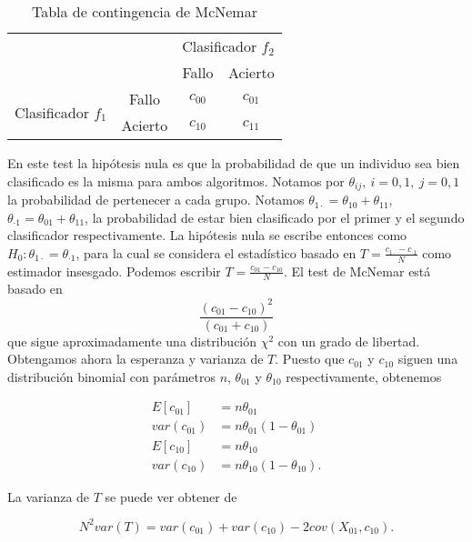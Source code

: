 \begin{table}[]
\centering
\caption{Tabla de contingencia de McNemar}
\label{Tb:McNemar}
\begin{tabular}{|lc|cc|}
\hline
                                                          &       & \multicolumn{2}{c|}{Clasificador $f_2$} \\ \cline{3-4} 
                                                          &         & Fallo              & Acierto            \\ \hline
\multicolumn{1}{|c|}{\multirow{2}{*}{Clasificador $f_1$}} & Fallo   & $c_{00}$           & $c_{01}$           \\
\multicolumn{1}{|c|}{}                                    & Acierto & $c_{10}$           & $c_{11}$           \\ \hline
\end{tabular}
\end{table}

	En este test la hipótesis nula es que la probabilidad de 
que un individuo sea bien clasificado es la misma para ambos 
algoritmos. Notamos por $\theta_{ij},\ i=0,1,\ j=0,1$ la 
probabilidad de pertenecer a cada grupo. Notamos 
$\theta_{1 \cdot} = \theta_{10} + \theta_{11}$, 
$\theta_{\cdot 1} = \theta_{01} + \theta_{11}$, la 
probabilidad de estar bien clasificado por el primer y el 
segundo clasificador respectivamente. La hipótesis nula se 
escribe entonces como $H_0: \theta_{1 \cdot} = 
\theta_{\cdot 1}$, para la cual se considera el estadístico 
basado en $T = \frac{c_{1 \cdot} - c_{\cdot 1}}{N}$ como 
estimador insesgado. Podemos escribir $T = \frac{c_{01} - 
c_{10}}{N}$. El test de McNemar está basado en
	\[ \frac{(c_{01} - c_{10})^2}{(c_{01} + c_{10})} \]
	que sigue aproximadamente una distribución $\chi^2$ con 
un grado de libertad. Obtengamos ahora la esperanza y 
varianza de $T$. Puesto que $c_{01}$ y $c_{10}$ siguen una 
distribución binomial con parámetros $n$, $\theta_{01}$ y 
$\theta_{10}$ respectivamente, obtenemos

\begin{align*}
	E[c_{01}] 	&= n \theta_{01} \\
	var(c_{01}) &= n \theta_{01} (1 - \theta_{01}) \\
	E[c_{10}] 	&= n \theta_{10} \\
	var(c_{10}) &= n \theta_{10} (1 - \theta_{10}).
\end{align*}

	La varianza de $T$ se puede ver obtener de 
	
\begin{equation}
	N^2 var(T) = var(c_{01}) + var(c_{10}) - 2 cov(X_{01}, c_{10}).
	\label{eq:McNemarVar}
\end{equation}

